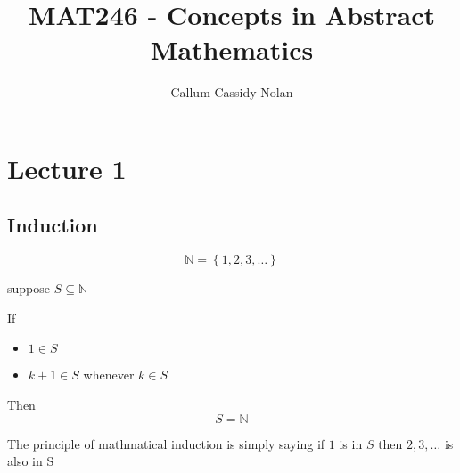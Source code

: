 \documentclass[11pt]{book}
\title{MAT246 - Concepts in Abstract Mathematics}
\author{Callum Cassidy-Nolan}
\begin{document}


\chapter{Lecture 1}%
\label{chp:lecture_1}

\section{Induction}%
\label{sec:induction}

\begin{note}
    \[
    \mathbb{N} = \left\{ 1, 2, 3, \ldots  \right\} 
    \]
\end{note}

\begin{defn}\label{defn:the_principle_of_mathmatical_induction_}
suppose $S \subseteq \mathbb{N} $  

If
\begin{itemize}
    \item $1\in S$ 
    \item $k + 1 \in S$ whenever $k \in S$ 
\end{itemize}
Then
\[
    \boxed{ S = \mathbb{N} }
\]

\end{defn}

The principle of mathmatical induction is simply saying if $1$ is in $S$ then $2, 3, \ldots $ is also in S
\end{document}
